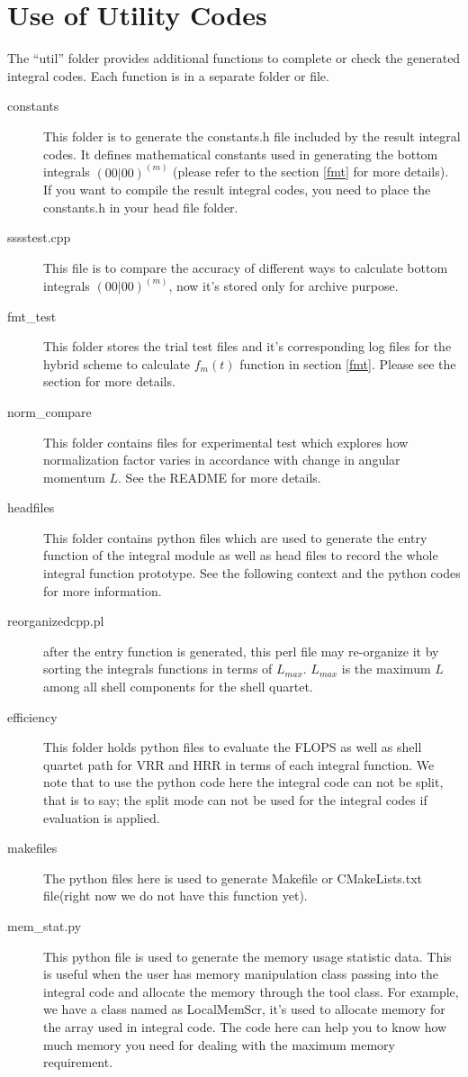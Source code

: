 \section{Use of Utility Codes}
\label{use_util_codes}
%
%
%
The ``util'' folder provides additional functions to complete or check
the generated integral codes. Each function is in a separate folder or 
file.
\begin{description}
 \item [constants] This folder is to generate the constants.h file included
 by the result integral codes. It defines mathematical constants used in generating
 the bottom integrals $(00|00)^{(m)}$ (please refer to the section \ref{fmt}
 for more details). If you want to compile the result integral codes, you 
 need to place the constants.h in your head file folder.
 \item [sssstest.cpp] This file is to compare the accuracy of different
 ways to calculate bottom integrals $(00|00)^{(m)}$, now it's stored only
 for archive purpose. 
 \item [fmt\_test] This folder stores the trial test files and it's corresponding log
 files for the hybrid scheme to calculate $f_{m}(t)$ function in section \ref{fmt}.
 Please see the section for more details.
 \item [norm\_compare] This folder contains files for experimental test which explores
 how normalization factor varies in accordance with change in angular momentum $L$. 
 See the README for more details.
 \item [headfiles] This folder contains python files which are used to generate 
 the entry function of the integral module as well as head files to record the whole 
 integral function prototype. See the following context and the python codes 
 for more information.
 \item [reorganizedcpp.pl] after the entry function is generated, this perl file
 may re-organize it by sorting the integrals functions in terms of $L_{max}$. $L_{max}$
 is the maximum $L$ among all shell components for the shell quartet.
 \item [efficiency] This folder holds python files to evaluate the FLOPS as well as
 shell quartet path for VRR and HRR in terms of each integral function. We note that
 to use the python code here the integral code can not be split, that is to say;
 the split mode can not be used for the integral codes if evaluation is applied.
 \item [makefiles] The python files here is used to generate Makefile or CMakeLists.txt 
 file(right now we do not have this function yet).
 \item [mem\_stat.py] This python file is used to generate the memory usage statistic data.
 This is useful when the user has memory manipulation class passing into the integral
 code and allocate the memory through the tool class. For example, we have a class named as 
 LocalMemScr, it's used to allocate memory for the array used in integral code. The code
 here can help you to know how much memory you need for dealing with the maximum memory
 requirement.
\end{description}
